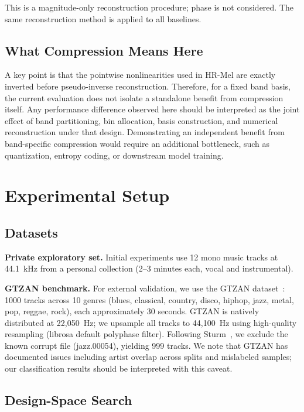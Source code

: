 \documentclass[twocolumn]{article}
\begin{document}
This is a magnitude-only reconstruction procedure; phase is not considered. The same reconstruction method is applied to all baselines.

\subsection{What Compression Means Here}

A key point is that the pointwise nonlinearities used in HR-Mel are exactly inverted before pseudo-inverse reconstruction. Therefore, for a fixed band basis, the current evaluation does not isolate a standalone benefit from compression itself. Any performance difference observed here should be interpreted as the joint effect of band partitioning, bin allocation, basis construction, and numerical reconstruction under that design. Demonstrating an independent benefit from band-specific compression would require an additional bottleneck, such as quantization, entropy coding, or downstream model training.

\section{Experimental Setup}

\subsection{Datasets}

\textbf{Private exploratory set.} Initial experiments use 12 mono music tracks at 44.1~kHz from a personal collection (2--3 minutes each, vocal and instrumental).

\textbf{GTZAN benchmark.} For external validation, we use the GTZAN dataset~\cite{tzanetakis2002gtzan}: 1000 tracks across 10 genres (blues, classical, country, disco, hiphop, jazz, metal, pop, reggae, rock), each approximately 30 seconds. GTZAN is natively distributed at 22,050~Hz; we upsample all tracks to 44,100~Hz using high-quality resampling (librosa default polyphase filter). Following Sturm~\cite{sturm2013gtzan}, we exclude the known corrupt file (jazz.00054), yielding 999 tracks. We note that GTZAN has documented issues including artist overlap across splits and mislabeled samples; our classification results should be interpreted with this caveat.

\subsection{Design-Space Search}
\label{sec:design_search}
\end{document}
